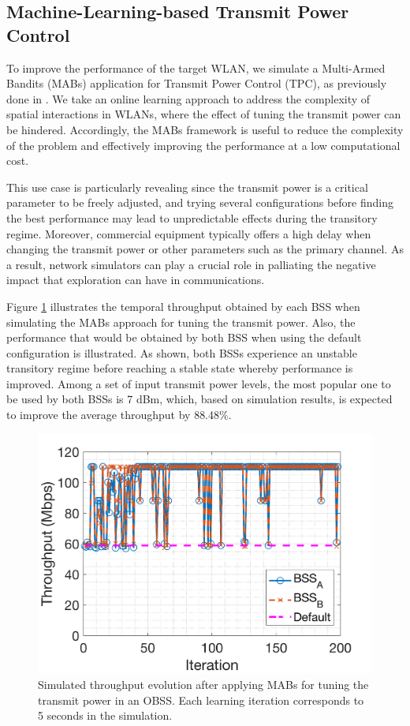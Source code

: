 \documentclass{article}
\begin{document}
	\subsection{Machine-Learning-based Transmit Power Control}
	To improve the performance of the target WLAN, we simulate a Multi-Armed Bandits (MABs) application for Transmit Power Control (TPC), as previously done in \cite{wilhelmi}. We take an online learning approach to address the complexity of spatial interactions in WLANs, where the effect of tuning the transmit power can be hindered. Accordingly, the MABs framework is useful to reduce the complexity of the problem and effectively improving the performance at a low computational cost. 
	
	This use case is particularly revealing since the transmit power is a critical parameter to be freely adjusted, and trying several configurations before finding the best performance may lead to unpredictable effects during the transitory regime. Moreover, commercial equipment typically offers a high delay when changing the transmit power or other parameters such as the primary channel. As a result, network simulators can play a crucial role in palliating the negative impact that exploration can have in communications.
	
	Figure \ref{fig:results_komondor} illustrates the temporal throughput obtained by each BSS when simulating the MABs approach for tuning the transmit power. Also, the performance that would be obtained by both BSS when using the default configuration is illustrated. As shown, both BSSs experience an unstable transitory regime before reaching a stable state whereby performance is improved. Among a set of input transmit power levels, the most popular one to be used by both BSSs is 7 dBm, which, based on simulation results, is expected to improve the average throughput by 88.48\%.
	
	\begin{figure}[ht!]
	\centering
	\includegraphics[width=0.6\columnwidth]{throughput_evolution_komondor.png}
	\caption{Simulated throughput evolution after applying MABs for tuning the transmit power in an OBSS. Each learning iteration corresponds to 5 seconds in the simulation.}
	\label{fig:results_komondor}
	\end{figure}
	
\end{document}
